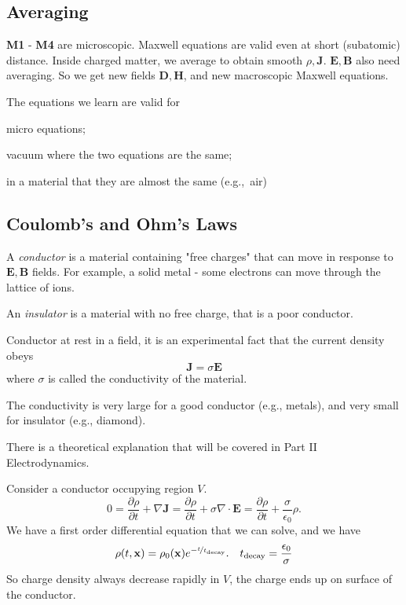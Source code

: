 \subsection{Averaging}
\textbf{M1} - \textbf{M4} are microscopic. Maxwell equations are valid even at short (subatomic) distance. Inside charged matter, we average to obtain smooth \(\rho, \mathbf{J} \). \(\mathbf{E} , \mathbf{B} \) also need averaging. So we get new fields \(\mathbf{D}, \textbf{H} \), and new macroscopic Maxwell equations.

The equations we learn are valid for
\begin{enumerate*}
    \item micro equations;
    \item vacuum where the two equations are the same;
    \item in a material that they are almost the same (e.g.,\ air)
\end{enumerate*}

\subsection{Coulomb's and Ohm's Laws}
\leavevmode
\begin{definition}
    A \textit{conductor} is a material containing "free charges" that can move in response to \(\mathbf{E}, \mathbf{B} \) fields. For example, a solid metal - some electrons can move through the lattice of ions.

    An \textit{insulator} is a material with no free charge, that is a poor conductor.
\end{definition}
\begin{theorem}
    Conductor at rest in a field, it is an experimental fact that the current density obeys
    \[
        \mathbf{J} = \sigma \mathbf{E}
    \]
    where \(\sigma\) is called the conductivity of the material.
\end{theorem}
The conductivity is very large for a good conductor (e.g., metals), and very small for insulator (e.g., diamond).

There is a theoretical explanation that will be covered in Part II Electrodynamics.

Consider a conductor occupying region \(V\).
\[
    0 = \frac{\partial \rho}{\partial t} +\nabla \mathbf{J} = \frac{\partial \rho}{\partial t} + \sigma \nabla \cdot \mathbf{E} = \frac{\partial \rho}{\partial t} + \frac{\sigma}{\epsilon_0}\rho.
\]
We have a first order differential equation that we can solve, and we have
\[
    \rho(t,\mathbf{x} ) = \rho_0(\mathbf{x} )e^{-\nicefrac{t}{t_{\text{decay}}}}. \quad t_{\text{decay}} = \frac{\epsilon_0}{\sigma}
\]
So charge density always decrease rapidly in \(V\), the charge ends up on surface of the conductor.

